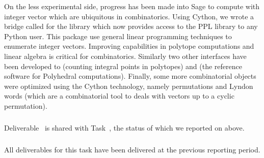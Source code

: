   On the less experimental side, progress has been made into Sage to compute
  with integer vector which are ubiquitous in combinatorics. Using Cython, we
  wrote a bridge called  for the  library which
  now provides access to the PPL library to any Python user. This package use
  general linear programming techniques to enumerate integer vectors.
  Improving \Sage capabilities in polytope computations and linear algebra is
  critical for combinatorics. Similarly two other interfaces have been developed
  to  (counting integral points in polytopes) and
   (the reference software for Polyhedral computations).
  Finally, some more combinatorial objects were optimized using the Cython
  technology, namely permutations and Lyndon words (which are a combinatorial
  tool to deals with vectors up to a cyclic permutation).


  \subparagraph{}

Deliverable~ is shared with
Task~, the status of which we reported on above.

  \subparagraph{}
  

  All deliverables for this task have been delivered at the previous
  reporting period.
